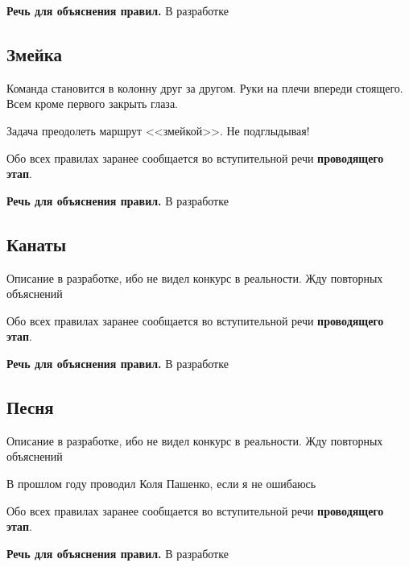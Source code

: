 \documentclass[a4paper, 14pt]{extarticle}
\theoremstyle{definition}
\begin{document}
\par \textbf{Речь для объяснения правил.} В разработке


\subsection{Змейка}

\par Команда становится в колонну друг за другом. Руки на плечи впереди стоящего. Всем кроме первого закрыть глаза.

\par Задача преодолеть маршрут <<змейкой>>. Не подглыдывая!

\par Обо всех правилах заранее сообщается во вступительной речи \textbf{проводящего этап}.

\par \textbf{Речь для объяснения правил.} В разработке



\subsection{Канаты}

\par Описание в разработке, ибо не видел конкурс в реальности. Жду повторных объяснений

\par 

\par Обо всех правилах заранее сообщается во вступительной речи \textbf{проводящего этап}.

\par \textbf{Речь для объяснения правил.} В разработке



\subsection{Песня}

\par Описание в разработке, ибо не видел конкурс в реальности. Жду повторных объяснений

\par В прошлом году проводил Коля Пашенко, если я не ошибаюсь

\par Обо всех правилах заранее сообщается во вступительной речи \textbf{проводящего этап}.

\par \textbf{Речь для объяснения правил.} В разработке
\end{document}
